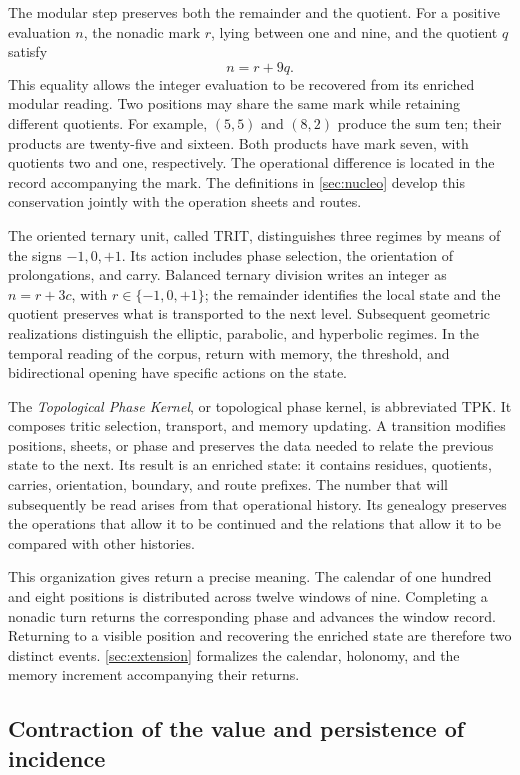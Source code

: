 The modular step preserves both the remainder and the quotient. For a
positive evaluation \(n\), the nonadic mark \(r\), lying between
one and nine, and the quotient \(q\) satisfy
\[
 n=r+9q.
\]
This equality allows the integer evaluation to be recovered from its enriched
modular reading. Two positions may share the same mark while
retaining different quotients. For example, \((5,5)\) and \((8,2)\)
produce the sum ten; their products are twenty-five and sixteen. Both
products have mark seven, with quotients two and one, respectively.
The operational difference is located in the record accompanying
the mark. The definitions in \cref{sec:nucleo} develop this
conservation jointly with the operation sheets and routes.

The oriented ternary unit, called TRIT, distinguishes three regimes
by means of the signs \(-1,0,+1\). Its action includes phase selection,
the orientation of prolongations, and carry. Balanced ternary
division writes an integer as \(n=r+3c\), with
\(r\in\{-1,0,+1\}\); the remainder identifies the local state and the
quotient preserves what is transported to the next level. Subsequent
geometric realizations distinguish the elliptic, parabolic, and
hyperbolic regimes. In the temporal reading of the corpus, return with memory,
the threshold, and bidirectional opening have specific actions on
the state.

The \emph{Topological Phase Kernel}, or topological phase kernel, is
abbreviated TPK. It composes tritic selection, transport, and
memory updating. A transition modifies positions, sheets, or
phase and preserves the data needed to relate the previous state
to the next. Its result is an enriched state: it contains
residues, quotients, carries, orientation, boundary, and route prefixes.
The number that will subsequently be read arises from that operational
history. Its genealogy preserves the operations that allow it
to be continued and the relations that allow it to be compared with other
histories.

This organization gives return a precise meaning. The calendar
of one hundred and eight positions is distributed across twelve windows of nine.
Completing a nonadic turn returns the corresponding phase and advances
the window record. Returning to a visible position and
recovering the enriched state are therefore two distinct events.
\cref{sec:extension} formalizes the calendar,
holonomy, and the memory increment accompanying their returns.

\subsection*{Contraction of the value and persistence of incidence}
\label{libnar:continuo}

